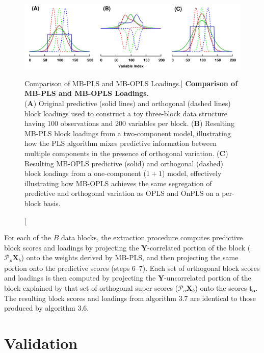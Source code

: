 \begin{figure}[ht!]
\includegraphics[width=6.5in]{figs/mva/14.png}
\caption
      [Comparison of MB-PLS and MB-OPLS Loadings.]{
  {\bf Comparison of MB-PLS and MB-OPLS Loadings.}
  \\
  ({\bf A}) Original predictive (solid lines) and orthogonal (dashed lines)
  block loadings used to construct a toy three-block data structure having
  100 observations and 200 variables per block.
  ({\bf B}) Resulting MB-PLS block loadings from a two-component model,
  illustrating how the PLS algorithm mixes predictive information between
  multiple components in the presence of orthogonal variation.
  ({\bf C}) Resulting MB-OPLS predictive (solid) and orthogonal (dashed)
  block loadings from a one-component ($1+1$) model, effectively illustrating
  how MB-OPLS achieves the same segregation of predictive and orthogonal
  variation as OPLS and OnPLS on a per-block basis.
}
\end{figure}

\begin{doublespace}
For each of the $B$ data blocks, the extraction procedure computes predictive
block scores and loadings by projecting the $\mathbf{Y}$-correlated portion
of the block ($\mathcal{P}_p \mathbf{X}_b$) onto the weights derived by MB-PLS,
and then projecting the same portion onto the predictive scores (steps 6--7).
Each set of orthogonal block scores and loadings is then computed by projecting
the $\mathbf{Y}$-uncorrelated portion of the block explained by that set of
orthogonal super-scores ($\mathcal{P}_o \mathbf{X}_b$) onto the scores
$\mathbf{t_o}$. The resulting block scores and loadings from algorithm 3.7 are
identical to those produced by algorithm 3.6.
\end{doublespace}

\section{Validation}

